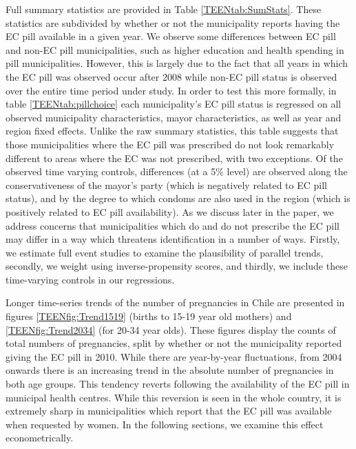 Full summary statistics are provided in Table \ref{TEENtab:SumStats}.  These
statistics are subdivided by whether or not the municipality reports having
the EC pill available in
a given year.  We observe some differences between EC pill and non-EC pill
municipalities, such as higher education and health spending in pill 
municipalities.  However, this is largely due to the fact that all years in which
the EC pill was observed occur after 2008 while non-EC pill status is observed over
the entire time period under study.  In order to test this more formally, in
table \ref{TEENtab:pillchoice} each municipality's EC pill status is regressed
on all observed municipality characteristics, mayor characteristics, as well as 
year and region fixed effects.  Unlike the raw summary statistics, this table 
suggests that those municipalities where the EC pill was prescribed do not look
remarkably different to areas where the EC was not prescribed, with two 
exceptions.  Of the observed time varying controls, differences (at a 5\% level)
are observed along the conservativeness of the mayor's party (which is negatively 
related to EC pill status), and by the degree to which condoms are also used in 
the region (which is positively related to EC pill availability).  As we discuss 
later in the paper, we address concerns that municipalities which do and do not 
prescribe the EC pill may differ in a way which threatens identification in a 
number of ways.  Firstly, we estimate full event studies to examine the 
plausibility of parallel trends, secondly, we weight using inverse-propensity 
scores, and thirdly, we include these time-varying controls in our regressions.

Longer time-series trends of the number of pregnancies in Chile are presented
in figures \ref{TEENfig:Trend1519} (births to 15-19 year old mothers) and 
\ref{TEENfig:Trend2034} (for 20-34 year olds).  These figures display the counts 
of total numbers of pregnancies, split by whether or not the municipality 
reported giving the EC pill in 2010.  While there are year-by-year fluctuations, 
from 2004 onwards there is an increasing trend in the absolute number of 
pregnancies in both age groups.  This tendency reverts following the availability 
of the EC pill in municipal health centres.  While this reversion is seen in the 
whole country, it is extremely sharp in municipalities which report that the 
EC pill was available when requested by women.  In the following sections, we
examine this effect econometrically.

